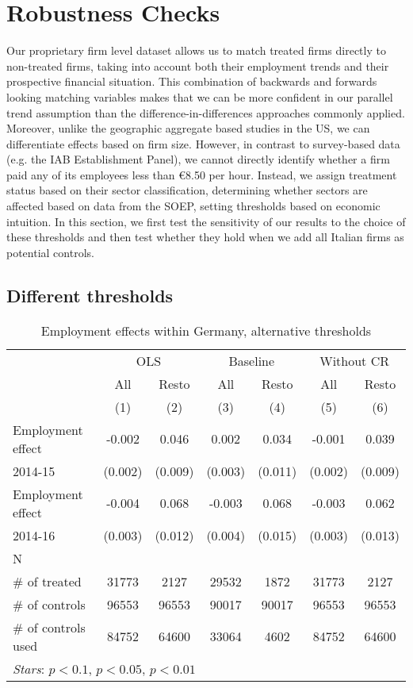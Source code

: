 \section{Robustness Checks} \label{chap:robustness}
Our proprietary firm level dataset allows us to match treated firms directly to non-treated firms, taking into account both their employment trends and their prospective financial situation. This combination of backwards and forwards looking matching variables makes that we can be more confident in our parallel trend assumption than the difference-in-differences approaches commonly applied. Moreover, unlike the geographic aggregate based studies in the US, we can differentiate effects based on firm size. However, in contrast to survey-based data (e.g. the IAB Establishment Panel), we cannot directly identify whether a firm paid any of its employees less than €8.50 per hour. Instead, we assign treatment status based on their sector classification, determining whether sectors are affected based on data from the SOEP, setting thresholds based on economic intuition. In this section, we first test the sensitivity of our results to the choice of these thresholds and then test whether they hold when we add all Italian firms as potential controls.

\subsection{Different thresholds}\label{sec:sectors}
\begin{table}[htbp]\centering
\caption{Employment effects within Germany, alternative thresholds}\label{table:robustness1}
\begin{tabular}{l|*{2}{c}|*{2}{c}|*{2}{c}}
\toprule
&\multicolumn{2}{c|}{OLS}&\multicolumn{2}{c|}{Baseline}&\multicolumn{2}{c}{Without CR}\\
&All & Resto &All & Resto &All & Resto \\
&(1)&(2)&(3)&(4)&(5)&(6)\\
\midrule
Employment effect & -0.002 & 0.046 & 0.002 & 0.034 & -0.001 & 0.039   \\
2014-15 & (0.002) & (0.009)\sym{***}& (0.003) & (0.011)\sym{***} & (0.002) & (0.009)\sym{***} \\
Employment effect & -0.004 & 0.068 & -0.003 & 0.068 & -0.003 & 0.062   \\
2014-16 & (0.003) & (0.012)\sym{***}& (0.004) & (0.015)\sym{***} & (0.003) & (0.013)\sym{***} \\
\midrule
N&&&&&&\\
\# of treated & 31773 & 2127 & 29532 & 1872 & 31773 & 2127     \\
\# of controls & 96553 & 96553 & 90017 & 90017 & 96553 & 96553    \\
\# of controls used & 84752 & 64600 & 33064 & 4602 & 84752 & 64600       \\
\bottomrule
\multicolumn{7}{p{0.7\textwidth}}{\emph{Stars}: \sym{*} \(p<0.1\), \sym{**} \(p<0.05\), \sym{***} \(p<0.01\)}\\
\end{tabular}
\end{table}


